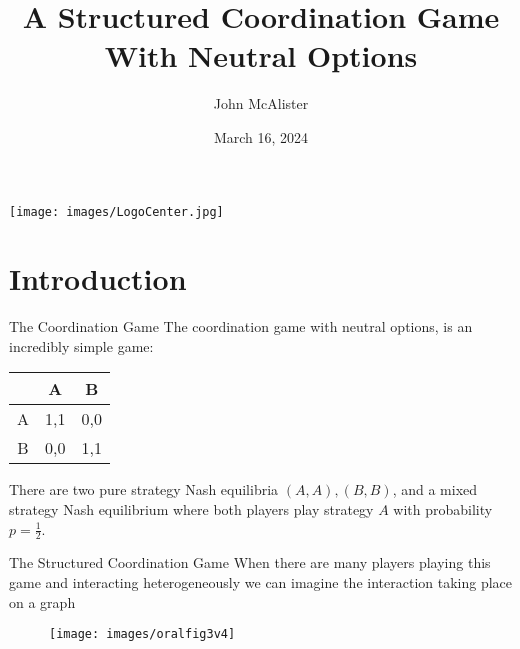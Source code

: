 \documentclass{beamer}
\title{A Structured Coordination Game With Neutral Options}
\author{John McAlister}
\institute[Fefferman Lab]{University of Tennessee - Knoxville}
\date{March 16, 2024}
\begin{document}
\begin{frame}[plain]
    \centering
    \maketitle
    \texttt{[image: images/LogoCenter.jpg]}
\end{frame}
\section{Introduction}
\begin{frame}{The Coordination Game}
		The coordination game with neutral options, is an incredibly simple game:
	\begin{center} 
		\begin{tabular}{c|cc}
			&A&B\\
			\hline 
			A&1,1&0,0\\
			B&0,0&1,1
		\end{tabular}
	\end{center}
	
	There are two pure strategy Nash equilibria $(A,A), (B,B)$, and a mixed strategy Nash equilibrium where both players play strategy $A$ with probability $p=\frac{1}{2}$.
\end{frame}

\begin{frame}{The Structured Coordination Game}
	When there are many players playing this game and interacting heterogeneously we can imagine the interaction taking place on a graph
	\begin{figure}
		\texttt{[image: images/oralfig3v4]}
	\end{figure}
\end{frame}
\end{document}
